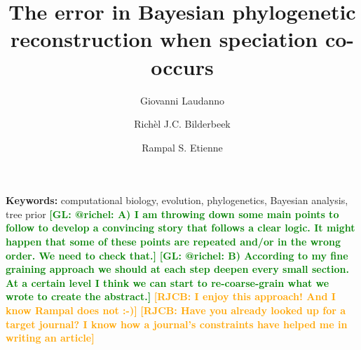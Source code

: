 \documentclass{article}
\title{The error in Bayesian phylogenetic reconstruction when speciation co-occurs}
\author[1]{Giovanni Laudanno}
\author[1]{Rich\`el J.C. Bilderbeek}
\author[1]{Rampal S. Etienne}
\affil[1]{Groningen Institute for Evolutionary Life Sciences, University of Groningen, Groningen, The Netherlands}
\newcommand*\richel[1]{\textcolor{orange}{\textbf{[RJCB: #1]}}}
\newcommand*\gio[1]{\textcolor{green}{\textbf{[GL: #1]}}}
\begin{document}
\maketitle

\begin{abstract}



  

  

  

  







\end{abstract}

{\bf Keywords:} computational biology, evolution, phylogenetics, Bayesian analysis, tree prior
\gio{@richel: A) I am throwing down some main points to follow to develop a convincing story that follows a clear logic. It might happen that some of these points are repeated and/or in the wrong order. We need to check that.}
\gio{@richel: B) According to my fine graining approach we should at each step deepen every small section. At a certain level I think we can start to re-coarse-grain what we wrote to create the abstract.}
\richel{I enjoy this approach! And I know Rampal does not :-)}
\richel{Have you already looked up for a target journal? I know how a journal's constraints have helped me 
in writing an article}
\end{document}
